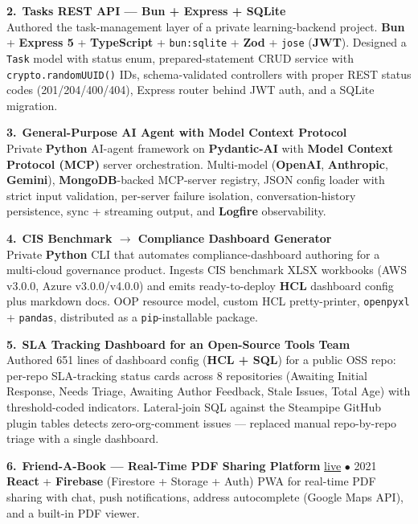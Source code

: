 \documentclass[10pt,letterpaper]{article}
\begin{document}
\vspace{3pt}
{\color{accent}\bfseries 2.}~\textbf{Tasks REST API --- Bun + Express + SQLite}\\
Authored the task-management layer of a private learning-backend project. \textbf{Bun} + \textbf{Express 5} + \textbf{TypeScript} + \texttt{bun:sqlite} + \textbf{Zod} + \texttt{jose} (\textbf{JWT}). Designed a \texttt{Task} model with status enum, prepared-statement CRUD service with \texttt{crypto.randomUUID()} IDs, schema-validated controllers with proper REST status codes (201/204/400/404), Express router behind JWT auth, and a SQLite migration.

\vspace{3pt}
{\color{accent}\bfseries 3.}~\textbf{General-Purpose AI Agent with Model Context Protocol}\\
Private \textbf{Python} AI-agent framework on \textbf{Pydantic-AI} with \textbf{Model Context Protocol (MCP)} server orchestration. Multi-model (\textbf{OpenAI}, \textbf{Anthropic}, \textbf{Gemini}), \textbf{MongoDB}-backed MCP-server registry, JSON config loader with strict input validation, per-server failure isolation, conversation-history persistence, sync + streaming output, and \textbf{Logfire} observability.

\vspace{3pt}
{\color{accent}\bfseries 4.}~\textbf{CIS Benchmark $\rightarrow$ Compliance Dashboard Generator}\\
Private \textbf{Python} CLI that automates compliance-dashboard authoring for a multi-cloud governance product. Ingests CIS benchmark XLSX workbooks (AWS v3.0.0, Azure v3.0.0/v4.0.0) and emits ready-to-deploy \textbf{HCL} dashboard config plus markdown docs. OOP resource model, custom HCL pretty-printer, \texttt{openpyxl} + \texttt{pandas}, distributed as a \texttt{pip}-installable package.

\vspace{3pt}
{\color{accent}\bfseries 5.}~\textbf{SLA Tracking Dashboard for an Open-Source Tools Team}\\
Authored 651 lines of dashboard config (\textbf{HCL + SQL}) for a public OSS repo: per-repo SLA-tracking status cards across 8 repositories (Awaiting Initial Response, Needs Triage, Awaiting Author Feedback, Stale Issues, Total Age) with threshold-coded indicators. Lateral-join SQL against the Steampipe GitHub plugin tables detects zero-org-comment issues --- replaced manual repo-by-repo triage with a single dashboard.

\vspace{3pt}
{\color{accent}\bfseries 6.}~\textbf{Friend-A-Book --- Real-Time PDF Sharing Platform} \hfill {\color{muted}\small \href{https://friend-a-book.web.app/}{live} \textcolor{rulec}{$\bullet$} 2021}\\
\textbf{React} + \textbf{Firebase} (Firestore + Storage + Auth) PWA for real-time PDF sharing with chat, push notifications, address autocomplete (Google Maps API), and a built-in PDF viewer.
\end{document}
